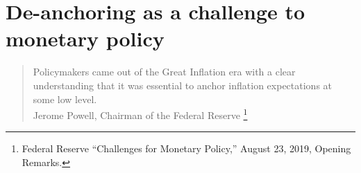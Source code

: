 \documentclass[11pt]{article}
\renewcommand{\[}{\begin{equation}}
\renewcommand{\]}{\end{equation}}
\begin{document}


\vspace{0.2cm}


\section{De-anchoring as a challenge to monetary policy}

\begin{quote}
Policymakers came out of the Great Inflation era with a clear understanding that it was essential to anchor inflation expectations at some low level. \\
Jerome Powell, Chairman of the Federal Reserve \footnote{Federal Reserve ``Challenges for Monetary Policy,''  August 23, 2019, Opening Remarks.}
\end{quote}
\end{document}
